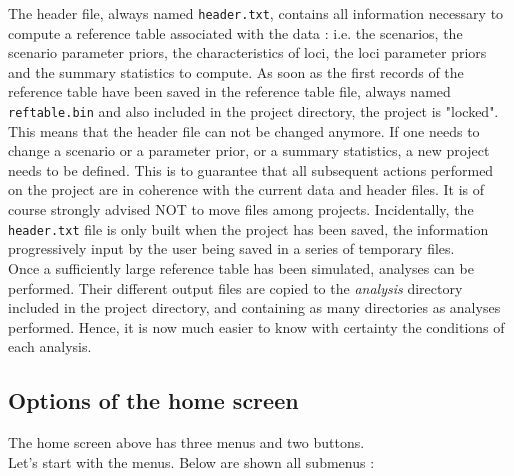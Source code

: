 The header file, always named \texttt{header.txt}, contains all information necessary to compute a reference table associated with the data : i.e. the scenarios, the scenario parameter priors, the characteristics of loci, the loci parameter priors and the summary statistics to compute.
As soon as the first records of the reference table have been saved in the reference table file,  always named \texttt{reftable.bin} and also included in the project directory, the project is "locked". This means that the header file can not be changed anymore. If one needs to change a scenario or a parameter prior, or a summary statistics, a new project needs to be defined. This is to guarantee that all subsequent actions performed on the project are in coherence with the current data and header files. It is of course strongly advised NOT to move files among projects.
Incidentally, the \texttt{header.txt} file is only built when the project has been saved, the information progressively input by the user being saved in a series of temporary files.\\

Once a sufficiently large reference table has been simulated, analyses can be performed. Their different output files are copied to the \emph{analysis} directory included in the project directory, and containing as many directories as analyses performed. Hence, it is now much easier to know with certainty the conditions of each analysis.    

\subsection{Options of the home screen}
The home screen above has three menus and two buttons.\\ 
Let's start with the menus. Below are shown all submenus :

